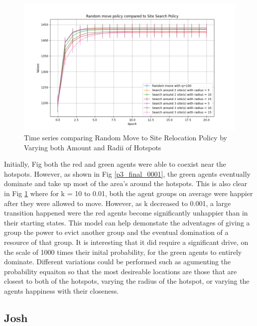 \documentclass[11pt]{article}
\begin{document}
	\begin{figure}
		\centering
		\includegraphics[width=.5\textwidth]{policies03.png}
		\caption{Time series comparing Random Move to Site Relocation Policy by Varying both Amount and Radii of Hotspots}
		\label{p3_ts}
	\end{figure}
	\FloatBarrier
	Initially, Fig both the red and green agents were able to coexist near the hotspots. However, as shown in Fig \ref{p3_final_0001}, the green agents eventually dominate and take up most of the area's around the hotspots. This is also clear in Fig \ref{p3_ts} where for k = 10 to 0.01, both the agent groups on average were happier after they were allowed to move. However, as k decreased to 0.001, a large transition happened were the red agents become significantly unhappier than in their starting states. This model can help demonstate the adventages of giving a group the power to evict another group and the eventual domination of a resource of that group. It is interesting that it did require a significant drive, on the scale of 1000 times their inital probability, for the green agents to entirely dominate. Different variations could be performed such as agumenting the probability equaiton so that the most desireable locations are those that are closest to both of the hotspots, varying the radius of the hotspot, or varying the agents happiness with their closeness. 
	
	
	\newpage
	
	\subsection{Josh}
	
	


	
\end{document}
